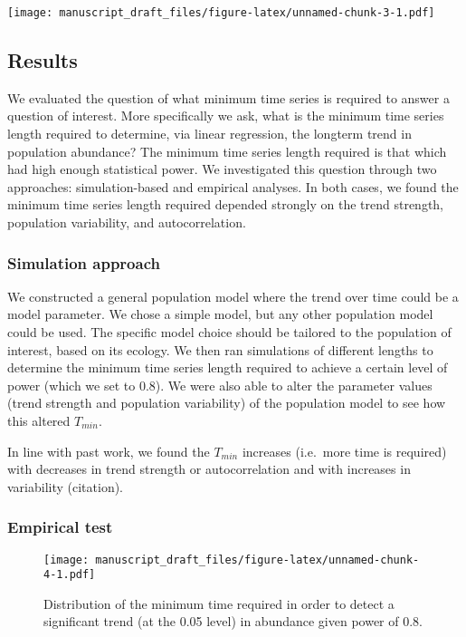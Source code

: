 \documentclass[12pt,]{article}
\begin{document}
\texttt{[image: manuscript\_draft\_files/figure-latex/unnamed-chunk-3-1.pdf]}

\subsection{Results}\label{results}

We evaluated the question of what minimum time series is required to
answer a question of interest. More specifically we ask, what is the
minimum time series length required to determine, via linear regression,
the longterm trend in population abundance? The minimum time series
length required is that which had high enough statistical power. We
investigated this question through two approaches: simulation-based and
empirical analyses. In both cases, we found the minimum time series
length required depended strongly on the trend strength, population
variability, and autocorrelation.

\subsubsection{Simulation approach}\label{simulation-approach}

We constructed a general population model where the trend over time
could be a model parameter. We chose a simple model, but any other
population model could be used. The specific model choice should be
tailored to the population of interest, based on its ecology. We then
ran simulations of different lengths to determine the minimum time
series length required to achieve a certain level of power (which we set
to 0.8). We were also able to alter the parameter values (trend strength
and population variability) of the population model to see how this
altered \(T_{min}\).

In line with past work, we found the \(T_{min}\) increases (i.e.~more
time is required) with decreases in trend strength or autocorrelation
and with increases in variability (citation).

\subsubsection{Empirical test}\label{empirical-test}

\begin{figure}[htbp]
\centering
\texttt{[image: manuscript\_draft\_files/figure-latex/unnamed-chunk-4-1.pdf]}
\caption{Distribution of the minimum time required in order to detect a
significant trend (at the 0.05 level) in abundance given power of
0.8.\label{fig:min_time_dist}}
\end{figure}
\end{document}
